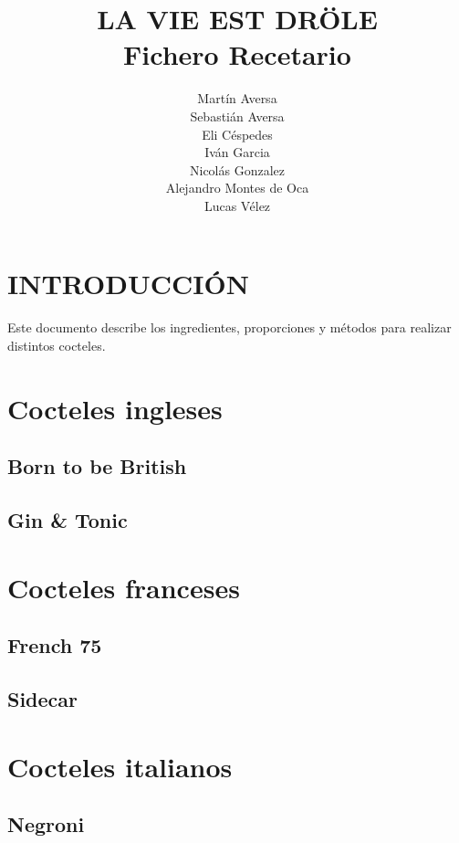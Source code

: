 \documentclass[a4paper]{spie}  %
\title{\uppercase{ {\fontsize{120}{120}\selectfont La vie est dr\"{o}le}} \\ 
\bigskip \bigskip \bigskip \bigskip
{\fontsize{40}{40}\selectfont Fichero Recetario}}
\author{Mart\'in Aversa \\
Sebasti\'an Aversa \\
Eli C\'espedes \\
Iv\'an Garcia \\
Nicol\'as Gonzalez \\
Alejandro Montes de Oca \\
Lucas V\'elez
\skiplinehalf}
\begin{document}
 
  \maketitle 

\section{INTRODUCCI\'ON}
\label{sec:intro}  %

Este documento describe los ingredientes, proporciones y m\'etodos para realizar distintos cocteles.
\bigskip
\bigskip
\tableofcontents

\newpage
\section{Cocteles ingleses}
\bigskip \bigskip \bigskip
\subsection{Born to be British}

\newpage

\newpage
\bigskip \bigskip \bigskip
\subsection{Gin \& Tonic}

\newpage

\newpage
\section{Cocteles franceses}
\bigskip \bigskip \bigskip
\subsection{French 75}

\newpage

\newpage
\bigskip \bigskip \bigskip
\subsection{Sidecar}

\newpage

\newpage
\section{Cocteles italianos}
\bigskip \bigskip \bigskip
\subsection{Negroni}

\newpage
\end{document}
